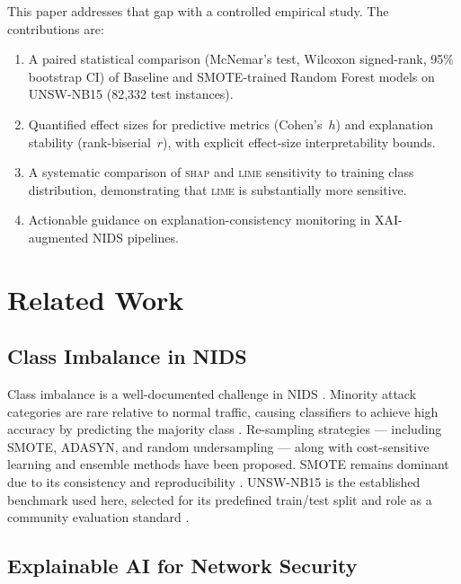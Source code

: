 \documentclass[conference,a4paper]{IEEEtran}
\newcommand{\SHAP}{\textsc{shap}\xspace}
\newcommand{\LIME}{\textsc{lime}\xspace}
\newcommand{\NIDS}{NIDS\xspace}
\newcommand{\SMOTE}{SMOTE\xspace}
\newcommand{\XAI}{XAI\xspace}
\newcommand{\rbs}{rank-biserial~$r$\xspace}
\newcommand{\cohensh}{Cohen's~$h$\xspace}
\begin{document}
This paper addresses that gap with a controlled empirical study. The contributions
are:
\begin{enumerate}
  \item A paired statistical comparison (McNemar's test, Wilcoxon signed-rank,
        95\% bootstrap CI) of Baseline and \SMOTE-trained Random Forest models
        on UNSW-NB15 (82,332 test instances).
  \item Quantified effect sizes for predictive metrics (\cohensh) and explanation
        stability (\rbs), with explicit effect-size interpretability bounds.
  \item A systematic comparison of \SHAP and \LIME sensitivity to training class
        distribution, demonstrating that \LIME is substantially more sensitive.
  \item Actionable guidance on explanation-consistency monitoring in
        \XAI-augmented \NIDS pipelines.
\end{enumerate}

\section{Related Work}
\label{sec:related}

\subsection{Class Imbalance in NIDS}

Class imbalance is a well-documented challenge in \NIDS
\cite{moustafa2015,shanmugam2025}. Minority attack categories are rare relative
to normal traffic, causing classifiers to achieve high accuracy by predicting the
majority class \cite{alshamy2021,chawla2002}. Re-sampling strategies ---
including \SMOTE, ADASYN, and random undersampling \cite{shanmugam2025} --- along
with cost-sensitive learning and ensemble methods \cite{shanmugam2025} have been
proposed. \SMOTE remains dominant due to its consistency and
reproducibility \cite{wu2022,sayegh2024}. UNSW-NB15 \cite{moustafa2015} is the
established benchmark used here, selected for its predefined train/test split and
role as a community evaluation standard \cite{more2024,hermosilla2025a}.

\subsection{Explainable AI for Network Security}
\end{document}
